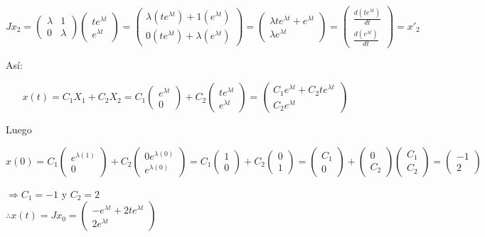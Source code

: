 $$J x_2= \begin{pmatrix}
\lambda & 1\\
0 & \lambda
\end{pmatrix}
\begin{pmatrix}
t e^{\lambda t}\\
e^{\lambda t}
\end{pmatrix}= 
\begin{pmatrix}
\lambda(t e^{\lambda t}) + 1(e^{\lambda t})\\
0(t e^{\lambda t}) + \lambda(e^{\lambda t})
\end{pmatrix}=
\begin{pmatrix}
\lambda t e^{\lambda t} + e^{\lambda t}\\
\lambda e^{\lambda t}
\end{pmatrix}=
\begin{pmatrix}
\frac{d(t e^{\lambda t})}{dt}\\
\frac{d(e^{\lambda t})}{dt}
\end{pmatrix} = x'_2$$

Así: 

$$x(t)= C_1 X_1 + C_2 X_2= C_1\begin{pmatrix}
e^{\lambda t}\\
0
\end{pmatrix}
+ C_2 \begin{pmatrix}
t e^{\lambda t}\\
e^{\lambda t}
\end{pmatrix}= 
\begin{pmatrix}
C_1 e^{\lambda t} + C_2 t e^{\lambda t}\\
C_2 e^{\lambda t}
\end{pmatrix}$$

Luego 

$$x(0)= C_1 \begin{pmatrix}
e^{\lambda(1)}\\
0
\end{pmatrix}
+ C_2 \begin{pmatrix}
0 e^{\lambda(0)}\\
e^{\lambda(0)}
\end{pmatrix}
= C_1 \begin{pmatrix}
1\\
0
\end{pmatrix}
+ C_2 \begin{pmatrix}
0\\
1
\end{pmatrix}=
\begin{pmatrix}
C_1\\
0
\end{pmatrix}
+ \begin{pmatrix}
0\\
C_2
\end{pmatrix}
\begin{pmatrix}
C_1\\
C_2
\end{pmatrix}=
\begin{pmatrix}
-1\\
2
\end{pmatrix}$$

$\Rightarrow C_1= -1$ y $C_2= 2$\\

$\therefore x(t)= J x_0= \begin{pmatrix}
-e^{\lambda t} + 2 t e^{\lambda t}\\
2 e^{\lambda t}
\end{pmatrix}$